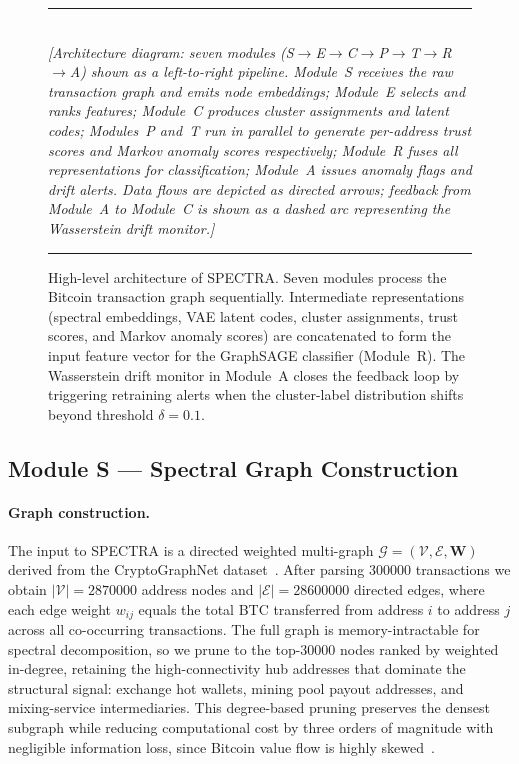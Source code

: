 \begin{figure}[t]
  \centering
  \rule{\columnwidth}{0.4pt}\\[2ex]
  \textit{[Architecture diagram: seven modules (S$\to$E$\to$C$\to$P$\to$T$\to$R$\to$A)
  shown as a left-to-right pipeline. Module~S receives the raw transaction
  graph and emits node embeddings; Module~E selects and ranks features;
  Module~C produces cluster assignments and latent codes; Modules~P and~T
  run in parallel to generate per-address trust scores and Markov anomaly
  scores respectively; Module~R fuses all representations for classification;
  Module~A issues anomaly flags and drift alerts. Data flows are depicted as
  directed arrows; feedback from Module~A to Module~C is shown as a dashed
  arc representing the Wasserstein drift monitor.]}\\[2ex]
  \rule{\columnwidth}{0.4pt}
  \caption{High-level architecture of \textsc{SPECTRA}.
    Seven modules process the Bitcoin transaction graph sequentially.
    Intermediate representations (spectral embeddings, VAE latent codes,
    cluster assignments, trust scores, and Markov anomaly scores) are
    concatenated to form the input feature vector for the GraphSAGE
    classifier (Module~R).
    The Wasserstein drift monitor in Module~A closes the feedback loop
    by triggering retraining alerts when the cluster-label distribution
    shifts beyond threshold $\delta=0.1$.}
  \label{fig:architecture}
\end{figure}

\subsection{Module S — Spectral Graph Construction}
\label{sec:module_s}

\paragraph{Graph construction.}
The input to \textsc{SPECTRA} is a directed weighted multi-graph
$\mathcal{G} = (\mathcal{V}, \mathcal{E}, \mathbf{W})$ derived from the
CryptoGraphNet dataset~\cite{cryptographnet}.
After parsing \num{300000} transactions we obtain
$|\mathcal{V}| = \num{2870000}$ address nodes and
$|\mathcal{E}| = \num{28600000}$ directed edges, where each edge weight
$w_{ij}$ equals the total BTC transferred from address $i$ to address $j$
across all co-occurring transactions.
The full graph is memory-intractable for spectral decomposition, so we prune
to the top-\num{30000} nodes ranked by weighted in-degree, retaining the
high-connectivity hub addresses that dominate the structural signal: exchange
hot wallets, mining pool payout addresses, and mixing-service intermediaries.
This degree-based pruning preserves the densest subgraph while reducing
computational cost by three orders of magnitude with negligible information
loss, since Bitcoin value flow is highly skewed~\cite{kondor2014rich}.

